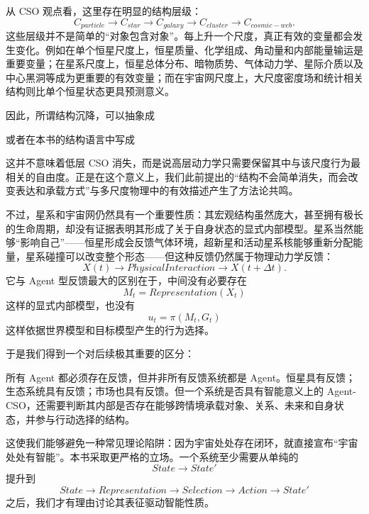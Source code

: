 从 CSO 观点看，这里存在明显的结构层级：
\[
C_{particle}
\rightarrow
C_{star}
\rightarrow
C_{galaxy}
\rightarrow
C_{cluster}
\rightarrow
C_{cosmic-web}.
\]
这些层级并不是简单的“对象包含对象”。每上升一个尺度，真正有效的变量都会发生变化。例如在单个恒星尺度上，恒星质量、化学组成、角动量和内部能量输运是重要变量；在星系尺度上，恒星总体分布、暗物质势、气体动力学、星际介质以及中心黑洞等成为更重要的有效变量；而在宇宙网尺度上，大尺度密度场和统计相关结构则比单个恒星状态更具预测意义。

因此，所谓结构沉降，可以抽象成
\begin{statementbox}
\centering
{}
\end{statementbox}
或者在本书的结构语言中写成
\begin{statementbox}
\centering
{}
\end{statementbox}
这并不意味着低层 CSO 消失，而是说高层动力学只需要保留其中与该尺度行为最相关的自由度。正是在这个意义上，我们此前提出的“结构不会简单消失，而会改变表达和承载方式”与多尺度物理中的有效描述产生了方法论共鸣。

不过，星系和宇宙网仍然具有一个重要性质：其宏观结构虽然庞大，甚至拥有极长的生命周期，却没有证据表明其形成了关于自身状态的显式内部模型。星系当然能够“影响自己”——恒星形成会反馈气体环境，超新星和活动星系核能够重新分配能量，星系碰撞可以改变整个形态——但这种反馈仍然属于物理动力学反馈：
\[
X(t)
\rightarrow
PhysicalInteraction
\rightarrow
X(t+\Delta t).
\]
它与 Agent 型反馈最大的区别在于，中间没有必要存在
\[
M_t = Representation(X_t)
\]
这样的显式内部模型，也没有
\[
u_t=\pi(M_t,G_t)
\]
这样依据世界模型和目标模型产生的行为选择。

于是我们得到一个对后续极其重要的区分：
\begin{statementbox}
\centering
{}
\end{statementbox}
所有 Agent 都必须存在反馈，但并非所有反馈系统都是 Agent。恒星具有反馈；生态系统具有反馈；市场也具有反馈。但一个系统是否具有智能意义上的 Agent-CSO，还需要判断其内部是否存在能够跨情境承载对象、关系、未来和自身状态，并参与行动选择的结构。

这使我们能够避免一种常见理论陷阱：因为宇宙处处存在闭环，就直接宣布“宇宙处处有智能”。本书采取更严格的立场。一个系统至少需要从单纯的
\[
State\rightarrow State'
\]
提升到
\[
State
\rightarrow
Representation
\rightarrow
Selection
\rightarrow
Action
\rightarrow
State'
\]
之后，我们才有理由讨论其表征驱动智能性质。

